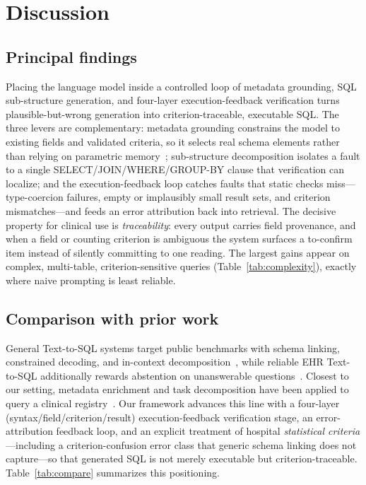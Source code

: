 \documentclass[11pt]{article}
\begin{document}
\section{Discussion}
\subsection{Principal findings}
Placing the language model inside a controlled loop of metadata grounding, SQL sub-structure
generation, and four-layer execution-feedback verification turns plausible-but-wrong generation into
criterion-traceable, executable SQL. The three levers are complementary: metadata grounding
constrains the model to existing fields and validated criteria, so it selects real schema elements
rather than relying on parametric memory~\cite{ragstruct2024,halluc2024}; sub-structure decomposition
isolates a fault to a single SELECT/JOIN/WHERE/GROUP-BY clause that verification can localize; and the
execution-feedback loop catches faults that static checks miss---type-coercion failures, empty or
implausibly small result sets, and criterion mismatches---and feeds an error attribution back into
retrieval. The decisive property for clinical use is \emph{traceability}: every output carries field
provenance, and when a field or counting criterion is ambiguous the system surfaces a to-confirm item
instead of silently committing to one reading. The largest gains appear on complex, multi-table,
criterion-sensitive queries (Table~\ref{tab:complexity}), exactly where naive prompting is least
reliable.

\subsection{Comparison with prior work}
General Text-to-SQL systems target public benchmarks with schema linking, constrained decoding, and
in-context decomposition~\cite{wang2020,scholak2021,pourreza2023,tsqlsurvey2024}, while reliable EHR
Text-to-SQL additionally rewards abstention on unanswerable questions~\cite{ehrsql2024}. Closest to
our setting, metadata enrichment and task decomposition have been applied to query a clinical
registry~\cite{metaclin2025}. Our framework advances this line with a four-layer
(syntax/field/criterion/result) execution-feedback verification stage, an error-attribution feedback
loop, and an explicit treatment of hospital \emph{statistical criteria}---including a
criterion-confusion error class that generic schema linking does not capture---so that generated SQL
is not merely executable but criterion-traceable. Table~\ref{tab:compare} summarizes this positioning.
\end{document}
